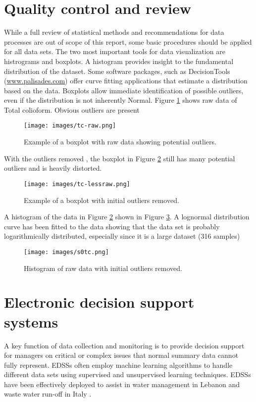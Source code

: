 \section{Quality control and review}

While a full review of statistical methods and recommendations for data processes are out of scope of this report, some basic procedures should be applied for all data sets. The two most important tools for data visualization are histrograms and boxplots.  A histogram provides insight to the fundamental distribution of the dataset. Some software packages, such as DecisionTools (\url{www.palisades.com}) offer curve fitting applications that estimate a distribution based on the data. Boxplots allow immediate identification of possible outliers, even if the distribution is not inherently Normal. Figure \ref{fig:rawtc} shows raw data of Total colioform. Obvious outliers are present

\begin{figure}[H]
\centering
\texttt{[image: images/tc-raw.png]} 
\caption{Example of a boxplot with raw data showing potential outliers.}
\label{fig:rawtc}
\end{figure}

With the outliers removed , the boxplot in Figure \ref{fig:lessrawtc} still has many potential outliers and is heavily distorted.

\begin{figure}[H]
\centering
\texttt{[image: images/tc-lessraw.png]} 
\caption{Example of a boxplot with initial outliers removed.}
\label{fig:lessrawtc}
\end{figure}

A histogram of the data in Figure \ref{fig:lessrawtc} shown in Figure \ref{fig:histc}. A lognormal distribution curve has been fitted to the data showing that the data set is probably logarithmically distributed, especially since it is a large dataset (316 samples)

\begin{figure}[H]
\centering
\texttt{[image: images/s0tc.png]} 
\caption{Histogram of raw data with initial outliers removed.}
\label{fig:histc}
\end{figure}

\section{Electronic decision support systems}
A key function of data collection and monitoring is to provide decision support for managers on critical or complex issues that normal summary data cannot fully represent. EDSSs often employ machine learning algorithms to handle different data sets using supervised and unsupervised learning techniques. EDSSs have been effectively deployed to assist in water management in Lebanon \citep{Assaf2008}and waste water run-off in Italy \citep{Massei2014}.

